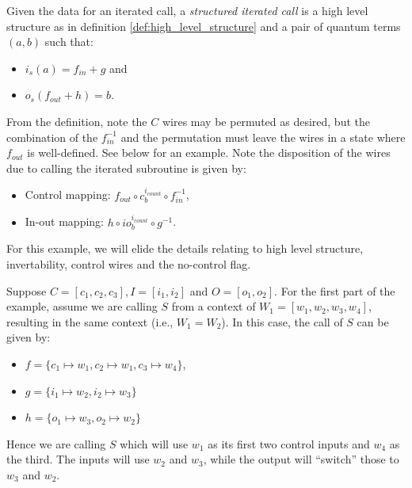 \begin{definition}\label{def:structured_iterated_call}
  Given the data for an iterated call,
  a \emph{structured iterated call} is a high level structure as in
  definition \ref{def:high_level_structure} and a pair of quantum
  terms $(a,b)$ such that:
  \begin{itemize}
    \item $i_s(a) = f_{in}+g$ and
    \item $o_s(f_{out}+h) = b$.
  \end{itemize}

\end{definition}

From the definition, note the $C$ wires may be permuted as
desired, but the combination of the $f_{in}^{-1}$ and
the permutation must leave the wires in a state where $f_{out}$
is well-defined. See below for an example.
Note the disposition of the wires due to calling the iterated
subroutine is given by:
\begin{itemize}
  \item Control mapping: $f_{out} \circ c_b^{i_{count}}\circ f_{in}^{-1}$,
  \item In-out mapping: $h \circ io_b^{i_{count}} \circ g^{-1}$.
\end{itemize}


\begin{example}
\end{example}
  For this example, we will elide the details relating to high level
  structure, invertability, control wires and the no-control flag.

  Suppose $C=[c_1,c_2,c_3], I=[i_1,i_2]$ and $O=[o_1,o_2]$.
  For the first part of the example, assume we are calling $S$
  from a context of $W_1=[w_1,w_2,w_3,w_4]$, resulting in the
  same context (i.e., $W_1 = W_2$).
  In this case, the call of $S$ can be given by:
  \begin{itemize}
    \item $f = \{c_1\mapsto w_1, c_2 \mapsto w_1, c_3 \mapsto w_4\}$,
    \item $g = \{i_1 \mapsto w_2, i_2 \mapsto w_3\}$
    \item $h = \{o_1 \mapsto w_3, o_2 \mapsto w_2\}$
  \end{itemize}
  Hence we are calling $S$ which will use $w_1$ as its
  first two control inputs and $w_4$ as the third. The
  inputs will use $w_2$ and $w_3$, while the output will
  ``switch'' those to $w_3$ and $w_2$.

